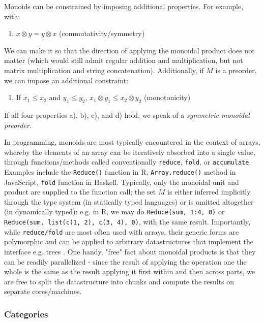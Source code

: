 \documentclass[12pt,a4paper]{article}
\begin{document}
Monoids can be constrained by imposing additional properties. For example, with:

\begin{enumerate}
\renewcommand{\theenumi}{\alph{enumi}}
\setcounter{enumi}{2}
\item $x \otimes y = y \otimes x$ (commutativity/symmetry)
\end{enumerate}

We can make it so that the direction of applying the monoidal product does not matter (which would still admit regular addition and multiplication, but not matrix multiplication and string concatenation). Additionally, if $M$ is a preorder, we can impose an additional constraint:

\begin{enumerate}
\renewcommand{\theenumi}{\alph{enumi}}
\setcounter{enumi}{3}
\item If $x_1 \leq x_2$ and $y_1 \leq y_2$, $x_1 \otimes y_1 \leq x_2 \otimes y_2$ (monotonicity)
\end{enumerate}

If all four properties a), b), c), and d) hold, we speak of a \textit{symmetric monoidal preorder}. 

In programming, monoids are most typically encountered in the context of arrays, whereby the elements of an array can be iteratively absorbed into a single value, through functions/methods called conventionally \texttt{reduce}, \texttt{fold}, or \texttt{accumulate}. Examples include the \texttt{Reduce()} function in R, \texttt{Array.reduce()} method in JavaScript, \texttt{fold} function in Haskell. Typically, only the monoidal unit and product are supplied to the function call; the set $M$ is either inferred implicitly through the type system (in statically typed languages) or is omitted altogether (in dynamically typed): e.g. in R, we may do \texttt{Reduce(sum, 1:4, 0)} or \texttt{Reduce(sum, list(c(1, 2), c(3, 4), 0)}, with the same result. Importantly, while \texttt{reduce/fold} are most often used with arrays, their generic forms are polymorphic and can be applied to arbitrary datastructures that implement the interface e.g. trees \citep{braithwaite2019}. One handy, "free" fact about monoidal products is that they can be readily parallelized - since the result of applying the operation one the whole is the same as the result applying it first within and then across parts, we are free to split the datastructure into chunks and compute the results on separate cores/machines. 

\subsubsection{Categories}
\end{document}
